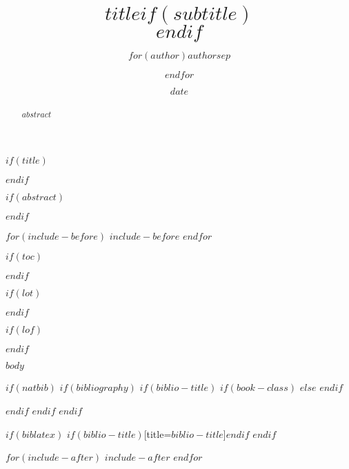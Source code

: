 \documentclass[$if(fontsize)$$fontsize$,$endif$$if(lang)$$lang$,$endif$$if(papersize)$$papersize$,$endif$$for(classoption)$$classoption$$sep$,$endfor$]{$documentclass$}
\title{$title$$if(subtitle)$\\\vspace{0.5em}{\large $subtitle$}$endif$}
\author{$for(author)$$author$$sep$ \and $endfor$}
\date{$date$}
\begin{document}
$if(title)$
    \maketitle
$endif$

$if(abstract)$
\begin{abstract}
    $abstract$
\end{abstract}
$endif$

$for(include-before)$
$include-before$
$endfor$


$if(toc)$
{
    \hypersetup{linkcolor=$if(toccolor)$$toccolor$$else$black$endif$}
    \setcounter{tocdepth}{$toc-depth$}


    \tableofcontents
}
$endif$

$if(lot)$
    \listoftables
$endif$

$if(lof)$
    \listoffigures
$endif$

$body$

$if(natbib)$
    $if(bibliography)$
        $if(biblio-title)$
            $if(book-class)$
              \renewcommand\bibname{$biblio-title$}
            $else$
              \renewcommand\refname{$biblio-title$}
            $endif$
            
        $endif$
    $endif$
$endif$

$if(biblatex)$
    \printbibliography$if(biblio-title)$[title=$biblio-title$]$endif$
$endif$

$for(include-after)$
$include-after$
$endfor$
\end{document}
